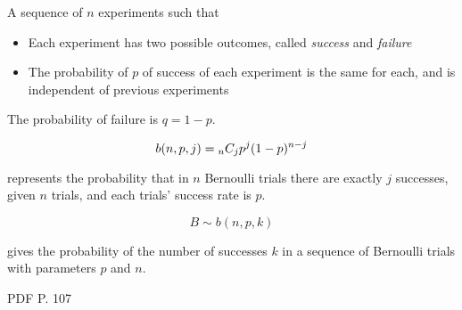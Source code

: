 A sequence of $n$ experiments such that

\begin{itemize}
    \item Each experiment has two possible outcomes, called \textit{success} and \textit{failure}
    \item The probability of $p$ of success of each experiment is the same for each, and is independent of previous experiments
\end{itemize}

The probability of failure is $q = 1 - p$.
\hformbar



\begin{equation}
    b(n, p, j) = {}_{n}C_{j} p^j (1 - p)^{n - j}
\end{equation}

represents the probability that in $n$ Bernoulli trials there are exactly $j$ successes, given $n$ trials, and each trials' success rate is $p$.
\hformbar




\begin{equation}
    B \sim b(n, p, k)
\end{equation}

gives the probability of the number of successes $k$ in a sequence of Bernoulli trials with parameters $p$ and $n$.
\hformbar

PDF P. 107

\newpage
